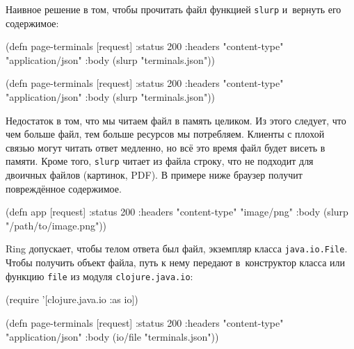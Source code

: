 
Наивное решение в том, чтобы прочитать файл функцией \verb|slurp| и~вернуть
его содержимое:

\ifnarrow

\begin{english}
  \begin{clojure}
(defn page-terminals [request]
  {:status 200
   :headers
   {"content-type" "application/json"}
   :body (slurp "terminals.json")})
  \end{clojure}
\end{english}

\else

\begin{english}
  \begin{clojure}
(defn page-terminals [request]
  {:status 200
   :headers {"content-type" "application/json"}
   :body (slurp "terminals.json")})
  \end{clojure}
\end{english}

\fi

Недостаток в том, что мы читаем файл в память целиком. Из этого следует, что чем
больше файл, тем больше ресурсов мы потребляем. Клиенты с плохой связью могут
читать ответ медленно, но всё это время файл будет висеть в памяти. Кроме того,
\verb|slurp| читает из файла строку, что не подходит для двоичных файлов
(картинок, PDF). В примере ниже браузер получит повреждённое содержимое.

\begin{english}
  \begin{clojure}
(defn app [request]
  {:status 200
   :headers {"content-type" "image/png"}
   :body (slurp "/path/to/image.png")})
  \end{clojure}
\end{english}


Ring допускает, чтобы телом ответа был файл, экземпляр класса
\verb|java.io.File|. Чтобы получить объект файла, путь к нему передают
в~конструктор класса или функцию \verb|file| из модуля \verb|clojure.java.io|:

\ifnarrow

\begin{english}
  \begin{clojure}
(require '[clojure.java.io :as io])

(defn page-terminals
  [request]
  {:status 200
   :headers
   {"content-type" "application/json"}
   :body (io/file "terminals.json")})
  \end{clojure}
\end{english}

